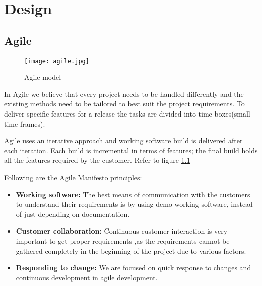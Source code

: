 \chapter{Design}



\section{Agile}

\begin{figure}[h!]
    \begin{center}
        \texttt{[image: agile.jpg]}
    \end{center}
    \caption{Agile model}
    \label{fig:agile}
\end{figure}

In Agile we believe that every project needs to be handled differently and the existing methods
 need to be tailored to best suit the project requirements. To deliver specific features for a 
 release the tasks are divided into time boxes(small time frames).

Agile uses an iterative approach and  working software build is delivered after each iteration. 
Each build is incremental in terms of features; the final build holds all the features required 
by the customer. Refer to figure \ref{fig:agile}

Following are the Agile Manifesto principles:

\begin{itemize}
    \item \textbf{Working software:} The best means of communication with the customers to understand
     their requirements is by using demo working software, instead of just depending on documentation.
     
     \item \textbf{Customer collaboration:} Continuous customer interaction is very important to get proper
      requirements ,as the requirements cannot be gathered completely in the beginning of the project due 
      to various factors.

      \item \textbf{Responding to change:} We are  focused on quick response to changes and 
      continuous development in agile development.
\end{itemize}

